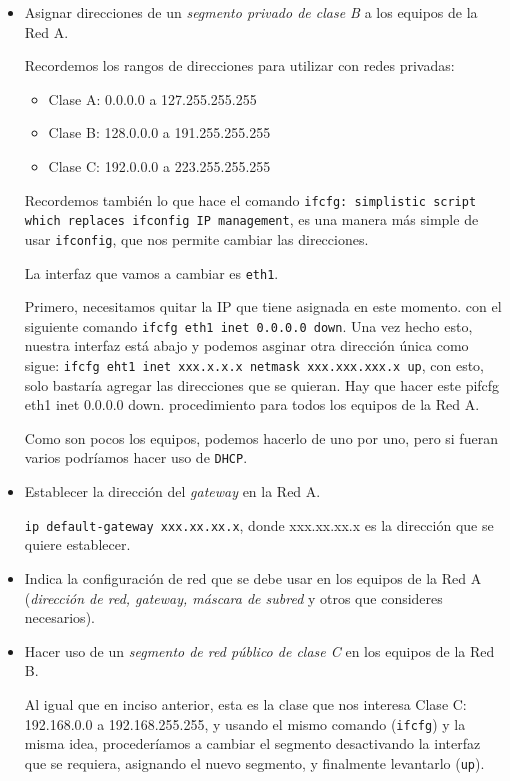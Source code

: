 \documentclass[spanish,12pt,letterpaper]{article}
\begin{document}
\begin{itemize}
\item Asignar direcciones de un \textit{segmento privado de clase B} a los
  equipos de la Red A.

  Recordemos los rangos de direcciones para utilizar con redes privadas:
  \begin{itemize}
  \item Clase A: 0.0.0.0 a 127.255.255.255
  \item Clase B: 128.0.0.0 a 191.255.255.255
  \item Clase C: 192.0.0.0 a 223.255.255.255
  \end{itemize}

  Recordemos también lo que hace el comando \texttt{ifcfg: simplistic script
    which replaces ifconfig IP management}, es una manera más simple de usar
  \texttt{ifconfig}, que nos permite cambiar las direcciones.

  La interfaz que vamos a cambiar es \texttt{eth1}.

  Primero, necesitamos quitar la IP que tiene asignada en este momento. con el
  siguiente comando \texttt{ifcfg eth1 inet 0.0.0.0 down}. Una vez hecho esto,
  nuestra interfaz está abajo y podemos asginar otra dirección única como sigue:
  \texttt{ifcfg eht1 inet xxx.x.x.x netmask xxx.xxx.xxx.x up}, con esto, solo
  bastaría agregar las direcciones que se quieran. Hay que hacer este
  pifcfg eth1 inet 0.0.0.0 down.
  procedimiento para todos los equipos de la Red A.

  Como son pocos los equipos, podemos hacerlo de uno por uno, pero si fueran
  varios podríamos hacer uso de \texttt{DHCP}.
\item Establecer la dirección del \textit{gateway} en la Red A.
  
  \texttt{ip default-gateway xxx.xx.xx.x}, donde xxx.xx.xx.x es la dirección que
  se quiere establecer.
  
\item Indica la configuración de red que se debe usar en los equipos de la Red A
  (\textit{dirección de red, gateway, máscara de subred} y otros que consideres
  necesarios).

\item Hacer uso de un \textit{segmento de red público de clase C} en los equipos
  de la Red B.

  Al igual que en inciso anterior, esta es la clase que nos interesa  Clase C:
  192.168.0.0 a 192.168.255.255, y usando el mismo comando (\texttt{ifcfg}) y la
  misma idea, procederíamos a cambiar el segmento desactivando la interfaz que se
  requiera, asignando el nuevo segmento, y finalmente levantarlo (\texttt{up}).
  

\end{itemize}
\end{document}
